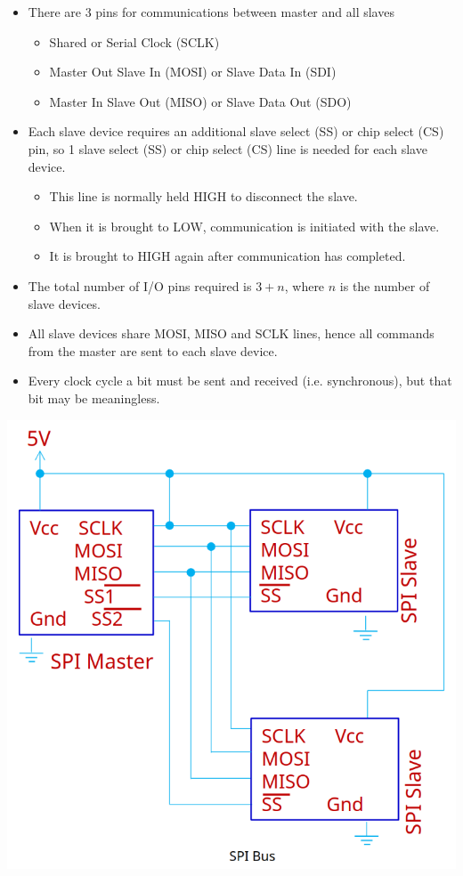 \documentclass[11pt]{article}
\begin{document}
\begin{itemize}
\item There are 3 pins for communications between master and all slaves
\begin{itemize}
\item Shared or Serial Clock (SCLK)
\item Master Out Slave In (MOSI) or Slave Data In (SDI)
\item Master In Slave Out (MISO) or Slave Data Out (SDO)
\end{itemize}
\item Each slave device requires an additional slave select (SS) or chip select (CS) pin, so 1 slave select (SS) or chip select (CS) line is needed for each slave device.
\begin{itemize}
\item This line is normally held HIGH to disconnect the slave.
\item When it is brought to LOW, communication is initiated with the slave.
\item It is brought to HIGH again after communication has completed.
\end{itemize}
\item The total number of I/O pins required is \(3 + n\), where \(n\) is the number of slave devices.
\item All slave devices share MOSI, MISO and SCLK lines, hence all commands from the master are sent to each slave device.
\item Every clock cycle a bit must be sent and received (i.e. synchronous), but that bit may be meaningless.
\end{itemize}

\begin{center}
\includegraphics[width=.9\linewidth]{./images/spi-bus-diagram.png}
\end{center}
\end{document}

